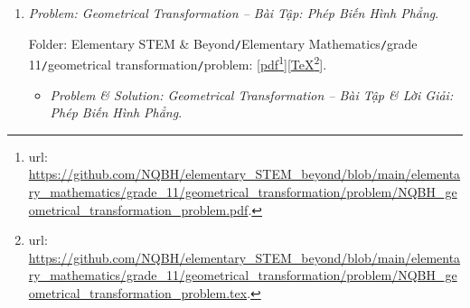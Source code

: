 \documentclass[12pt]{article}
\begin{document}
\begin{enumerate}
	Folder: {\sf Elementary STEM \& Beyond{\tt/}Elementary Mathematics{\tt/}grade 11{\tt/}orthogonality{\tt/}problem}: [\href{https://github.com/NQBH/elementary_STEM_beyond/blob/main/elementary_mathematics/grade_11/orthogonality/problem/NQBH_orthogonality_problem.pdf}{pdf}\footnote{{\sc url}: \url{https://github.com/NQBH/elementary_STEM_beyond/blob/main/elementary_mathematics/grade_11/orthogonality/problem/NQBH_orthogonality_problem.pdf}.}][\href{https://github.com/NQBH/elementary_STEM_beyond/blob/main/elementary_mathematics/grade_11/orthogonality/problem/NQBH_orthogonality_problem.tex}{\TeX}\footnote{{\sc url}: \url{https://github.com/NQBH/elementary_STEM_beyond/blob/main/elementary_mathematics/grade_11/orthogonality/problem/NQBH_orthogonality_problem.tex}.}].
	\begin{itemize}
		\item {\it Problem \& Solution: Perpendicular Relation in 3D Space. Orthographic Projection -- Bài Tập \& Lời Giải: Quan Hệ Vuông Góc Trong Không Gian 3D. Phép Chiếu Vuông Góc}.
		
		Folder: {\sf Elementary STEM \& Beyond{\tt/}Elementary Mathematics{\tt/}grade 11{\tt/}orthogonality{\tt/}solution}: [\href{https://github.com/NQBH/elementary_STEM_beyond/blob/main/elementary_mathematics/grade_11/orthogonality/solution/NQBH_orthogonality_solution.pdf}{pdf}\footnote{{\sc url}: \url{https://github.com/NQBH/elementary_STEM_beyond/blob/main/elementary_mathematics/grade_11/orthogonality/solution/NQBH_orthogonality_solution.pdf}.}][\href{https://github.com/NQBH/elementary_STEM_beyond/blob/main/elementary_mathematics/grade_11/orthogonality/solution/NQBH_orthogonality_solution.tex}{\TeX}\footnote{{\sc url}: \url{https://github.com/NQBH/elementary_STEM_beyond/blob/main/elementary_mathematics/grade_11/orthogonality/solution/NQBH_orthogonality_solution.tex}.}].
	\end{itemize}
	\item {\it Problem: Geometrical Transformation -- Bài Tập: Phép Biến Hình Phẳng}.
	
	Folder: {\sf Elementary STEM \& Beyond{\tt/}Elementary Mathematics{\tt/}grade 11{\tt/}geometrical transformation{\tt/}problem}: [\href{https://github.com/NQBH/elementary_STEM_beyond/blob/main/elementary_mathematics/grade_11/geometrical_transformation/problem/NQBH_geometrical_transformation_problem.pdf}{pdf}\footnote{{\sc url}: \url{https://github.com/NQBH/elementary_STEM_beyond/blob/main/elementary_mathematics/grade_11/geometrical_transformation/problem/NQBH_geometrical_transformation_problem.pdf}.}][\href{https://github.com/NQBH/elementary_STEM_beyond/blob/main/elementary_mathematics/grade_11/geometrical_transformation/problem/NQBH_geometrical_transformation_problem.tex}{\TeX}\footnote{{\sc url}: \url{https://github.com/NQBH/elementary_STEM_beyond/blob/main/elementary_mathematics/grade_11/geometrical_transformation/problem/NQBH_geometrical_transformation_problem.tex}.}].
	\begin{itemize}
		\item {\it Problem \& Solution: Geometrical Transformation -- Bài Tập \& Lời Giải: Phép Biến Hình Phẳng}.
		

\end{itemize}
\end{enumerate}
\end{document}
